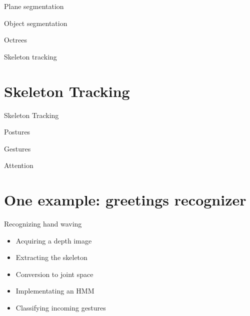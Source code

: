 \documentclass[compress]{beamer}
\begin{document}
\begin{frame}{Plane segmentation}
\end{frame}

\begin{frame}{Object segmentation}
\end{frame}

\begin{frame}{Octrees}

\end{frame}

\begin{frame}{Skeleton tracking}
\end{frame}



\section{Skeleton Tracking}

\begin{frame}{Skeleton Tracking}
\end{frame}

\begin{frame}{Postures}
\end{frame}

\begin{frame}{Gestures}
\end{frame}

\begin{frame}{Attention}
\end{frame}



\section{One example: greetings recognizer}

\begin{frame}{Recognizing hand waving}
    \begin{itemize}
        \item Acquiring a depth image
        \item Extracting the skeleton
        \item Conversion to joint space
        \item Implementating an HMM
        \item Classifying incoming gestures
    \end{itemize}
\end{frame}
\end{document}
